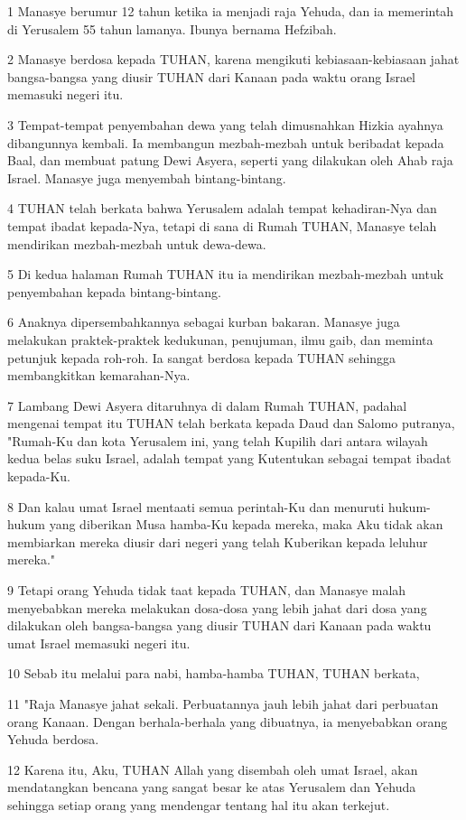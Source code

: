 \par 1 Manasye berumur 12 tahun ketika ia menjadi raja Yehuda, dan ia memerintah di Yerusalem 55 tahun lamanya. Ibunya bernama Hefzibah.
\par 2 Manasye berdosa kepada TUHAN, karena mengikuti kebiasaan-kebiasaan jahat bangsa-bangsa yang diusir TUHAN dari Kanaan pada waktu orang Israel memasuki negeri itu.
\par 3 Tempat-tempat penyembahan dewa yang telah dimusnahkan Hizkia ayahnya dibangunnya kembali. Ia membangun mezbah-mezbah untuk beribadat kepada Baal, dan membuat patung Dewi Asyera, seperti yang dilakukan oleh Ahab raja Israel. Manasye juga menyembah bintang-bintang.
\par 4 TUHAN telah berkata bahwa Yerusalem adalah tempat kehadiran-Nya dan tempat ibadat kepada-Nya, tetapi di sana di Rumah TUHAN, Manasye telah mendirikan mezbah-mezbah untuk dewa-dewa.
\par 5 Di kedua halaman Rumah TUHAN itu ia mendirikan mezbah-mezbah untuk penyembahan kepada bintang-bintang.
\par 6 Anaknya dipersembahkannya sebagai kurban bakaran. Manasye juga melakukan praktek-praktek kedukunan, penujuman, ilmu gaib, dan meminta petunjuk kepada roh-roh. Ia sangat berdosa kepada TUHAN sehingga membangkitkan kemarahan-Nya.
\par 7 Lambang Dewi Asyera ditaruhnya di dalam Rumah TUHAN, padahal mengenai tempat itu TUHAN telah berkata kepada Daud dan Salomo putranya, "Rumah-Ku dan kota Yerusalem ini, yang telah Kupilih dari antara wilayah kedua belas suku Israel, adalah tempat yang Kutentukan sebagai tempat ibadat kepada-Ku.
\par 8 Dan kalau umat Israel mentaati semua perintah-Ku dan menuruti hukum-hukum yang diberikan Musa hamba-Ku kepada mereka, maka Aku tidak akan membiarkan mereka diusir dari negeri yang telah Kuberikan kepada leluhur mereka."
\par 9 Tetapi orang Yehuda tidak taat kepada TUHAN, dan Manasye malah menyebabkan mereka melakukan dosa-dosa yang lebih jahat dari dosa yang dilakukan oleh bangsa-bangsa yang diusir TUHAN dari Kanaan pada waktu umat Israel memasuki negeri itu.
\par 10 Sebab itu melalui para nabi, hamba-hamba TUHAN, TUHAN berkata,
\par 11 "Raja Manasye jahat sekali. Perbuatannya jauh lebih jahat dari perbuatan orang Kanaan. Dengan berhala-berhala yang dibuatnya, ia menyebabkan orang Yehuda berdosa.
\par 12 Karena itu, Aku, TUHAN Allah yang disembah oleh umat Israel, akan mendatangkan bencana yang sangat besar ke atas Yerusalem dan Yehuda sehingga setiap orang yang mendengar tentang hal itu akan terkejut.
